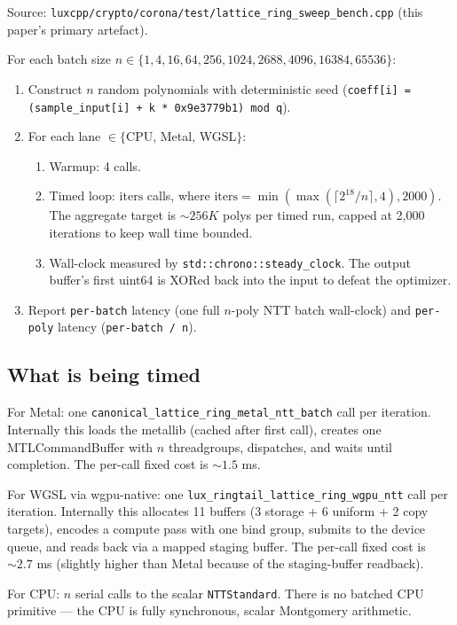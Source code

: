 Source: \texttt{luxcpp/crypto/corona/test/lattice\_ring\_sweep\_bench.cpp}
(this paper's primary artefact).

For each batch size $n \in \{1, 4, 16, 64, 256, 1024, 2688, 4096,
16384, 65536\}$:
\begin{enumerate}[nosep,leftmargin=2em]
\item Construct $n$ random polynomials with deterministic seed
(\texttt{coeff[i] = (sample\_input[i] + k * 0x9e3779b1) mod q}).
\item For each lane $\in \{$CPU, Metal, WGSL$\}$:
\begin{enumerate}[nosep,leftmargin=2em]
\item Warmup: 4 calls.
\item Timed loop: $\mathrm{iters}$ calls, where
$\mathrm{iters} = \min(\max(\lceil 2^{18}/n \rceil, 4), 2000)$.
The aggregate target is $\sim 256K$ polys per timed run, capped
at 2{,}000 iterations to keep wall time bounded.
\item Wall-clock measured by \texttt{std::chrono::steady\_clock}.
The output buffer's first uint64 is XORed back into the input to
defeat the optimizer.
\end{enumerate}
\item Report \texttt{per-batch} latency (one full $n$-poly NTT
batch wall-clock) and \texttt{per-poly} latency
(\texttt{per-batch / n}).
\end{enumerate}

\subsection{What is being timed}

For Metal: one
\texttt{canonical\_lattice\_ring\_metal\_ntt\_batch} call per
iteration. Internally this loads the metallib (cached after first
call), creates one MTLCommandBuffer with $n$ threadgroups, dispatches,
and waits until completion. The per-call fixed cost is
$\sim 1.5$ ms.

For WGSL via wgpu-native: one
\texttt{lux\_ringtail\_lattice\_ring\_wgpu\_ntt} call per iteration.
Internally this allocates 11 buffers (3 storage + 6 uniform + 2
copy targets), encodes a compute pass with one bind group, submits
to the device queue, and reads back via a mapped staging buffer.
The per-call fixed cost is $\sim 2.7$ ms (slightly higher than Metal
because of the staging-buffer readback).

For CPU: $n$ serial calls to the scalar
\texttt{NTTStandard}. There is no batched CPU primitive — the CPU
is fully synchronous, scalar Montgomery arithmetic.

